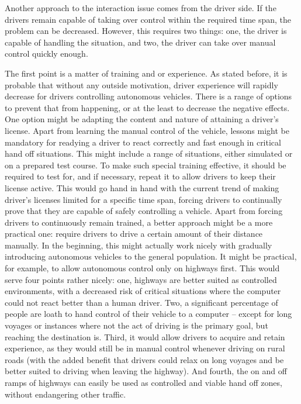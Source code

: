 \documentclass{acm_proc_article-sp}
\begin{document}
Another approach to the interaction issue comes from the driver side.
If the drivers remain capable of taking over control within the required time span, the problem can be decreased.
However, this requires two things: one, the driver is capable of handling the situation, and two, the driver can take over manual control quickly enough.

The first point is a matter of training and or experience.
As stated before, it is probable that without any outside motivation, driver experience will rapidly decrease for drivers controlling autonomous vehicles.
There is a range of options to prevent that from happening, or at the least to decrease the negative effects.
One option might be adapting the content and nature of attaining a driver's license.
Apart from learning the manual control of the vehicle, lessons might be mandatory for readying a driver to react correctly and fast enough in critical hand off situations.
This might include a range of situations, either simulated or on a prepared test course.
To make such special training effective, it should be required to test for, and if necessary, repeat it to allow drivers to keep their license active.
This would go hand in hand with the current trend of making driver's licenses limited for a specific time span, forcing drivers to continually prove that they are capable of safely controlling a vehicle.
Apart from forcing drivers to continuously remain trained, a better approach might be a more practical one: require drivers to drive a certain amount of their distance manually.
In the beginning, this might actually work nicely with gradually introducing autonomous vehicles to the general population.
It might be practical, for example, to allow autonomous control only on highways first.
This would serve four points rather nicely: one, highways are better suited as controlled environments, with a decreased risk of critical situations where the computer could not react better than a human driver.
Two, a significant percentage of people are loath to hand control of their vehicle to a computer \cite{www:power_study} – except for long voyages or instances where not the act of driving is the primary goal, but reaching the destination is.
Third, it would allow drivers to acquire and retain experience, as they would still be in manual control whenever driving on rural roads (with the added benefit that drivers could relax on long voyages and be better suited to driving when leaving the highway).
And fourth, the on and off ramps of highways can easily be used as controlled and viable hand off zones, without endangering other traffic.
\end{document}
